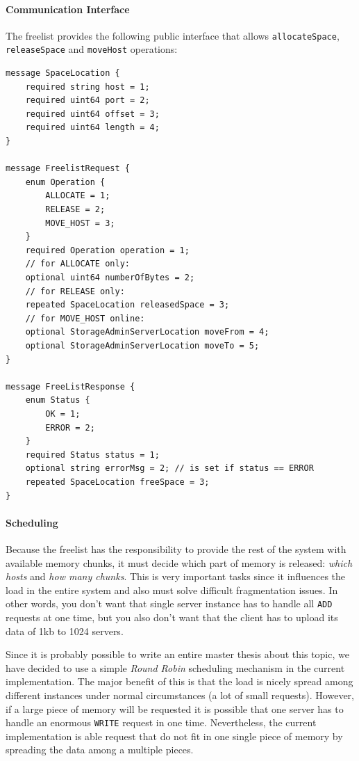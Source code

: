 \documentclass[12pt,a4paper]{scrartcl}
\begin{document}
\paragraph{Communication Interface}
The freelist provides the following public interface that allows \verb|allocateSpace|, \verb|releaseSpace| and \verb|moveHost| operations:
\begin{verbatim}
message SpaceLocation {
    required string host = 1;
    required uint64 port = 2;
    required uint64 offset = 3;
    required uint64 length = 4;
}

message FreelistRequest {
    enum Operation {
        ALLOCATE = 1;
        RELEASE = 2;
        MOVE_HOST = 3;
    }
    required Operation operation = 1;
    // for ALLOCATE only:
    optional uint64 numberOfBytes = 2;
    // for RELEASE only:
    repeated SpaceLocation releasedSpace = 3;
    // for MOVE_HOST online:
    optional StorageAdminServerLocation moveFrom = 4;
    optional StorageAdminServerLocation moveTo = 5;
}

message FreeListResponse {
    enum Status {
        OK = 1;
        ERROR = 2;
    }
    required Status status = 1;
    optional string errorMsg = 2; // is set if status == ERROR
    repeated SpaceLocation freeSpace = 3;
}
\end{verbatim}

\paragraph{Scheduling}
\label{sec:scheduling}
Because the freelist has the responsibility to provide the rest of the system with available memory chunks, it must decide which part of memory is released: \emph{which hosts} and \emph{how many chunks}. This is very important tasks since it influences the load in the entire system and also must solve difficult fragmentation issues. In other words, you don't want that single server instance has to handle all \verb|ADD| requests at one time, but you also don't want that the client has to upload its data of 1kb to 1024 servers.

Since it is probably possible to write an entire master thesis about this topic, we have decided to use a simple \emph{Round Robin} scheduling mechanism in the current implementation. The major benefit of this is that the load is nicely spread among different instances under normal circumstances (a lot of small requests). However, if a large piece of memory will be requested it is possible that one server has to handle an enormous \verb|WRITE| request in one time. Nevertheless, the current implementation is able request that do not fit in one single piece of memory by spreading the data among a multiple pieces.
\end{document}
